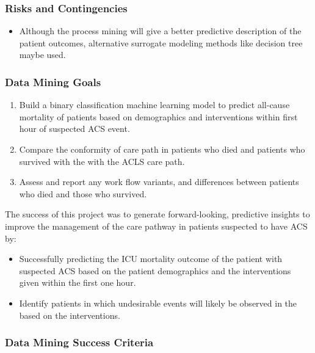 \documentclass[
]{article}
\providecommand{\tightlist}{%
  \setlength{\itemsep}{0pt}\setlength{\parskip}{0pt}}
\begin{document}
\hypertarget{risks-and-contingencies}{%
\subsubsection{Risks and Contingencies}\label{risks-and-contingencies}}

\begin{itemize}
\tightlist
\item
  Although the process mining will give a better predictive description
  of the patient outcomes, alternative surrogate modeling methods like
  decision tree maybe used.
\end{itemize}

\hypertarget{data-mining-goals}{%
\subsubsection{Data Mining Goals}\label{data-mining-goals}}

\begin{enumerate}
\def\labelenumi{\arabic{enumi}.}
\tightlist
\item
  Build a binary classification machine learning model to predict
  all-cause mortality of patients based on demographics and
  interventions within first hour of suspected ACS event.
\item
  Compare the conformity of care path in patients who died and patients
  who survived with the with the ACLS care path.
\item
  Assess and report any work flow variants, and differences between
  patients who died and those who survived.
\end{enumerate}

The success of this project was to generate forward-looking, predictive
insights to improve the management of the care pathway in patients
suspected to have ACS by:

\begin{itemize}
\tightlist
\item
  Successfully predicting the ICU mortality outcome of the patient with
  suspected ACS based on the patient demographics and the interventions
  given within the first one hour.
\item
  Identify patients in which undesirable events will likely be observed
  in the based on the interventions.
\end{itemize}

\hypertarget{data-mining-success-criteria}{%
\subsubsection{Data Mining Success
Criteria}\label{data-mining-success-criteria}}
\end{document}

